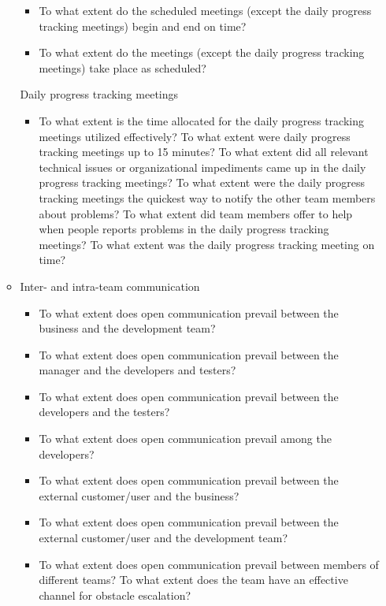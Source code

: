 \begin{appendices}
\begin{itemize}
\begin{itemize}
\begin{itemize}
					\item To what extent do the scheduled meetings (except the daily progress tracking meetings) begin and end on time? 
					\item To what extent do the meetings (except the daily progress tracking meetings) take place as scheduled? 
				\end{itemize}
			\addition Daily progress tracking meetings
				\begin{itemize}
					\item To what extent is the time allocated for the daily progress tracking meetings utilized effectively? 
					\addition To what extent were daily progress tracking meetings up to 15 minutes?
					\addition To what extent did all relevant technical issues or organizational impediments came up in the daily progress tracking meetings?
					\addition To what extent were the daily progress tracking meetings the quickest way to notify the other team members about problems?
					\addition To what extent did team members offer to help when people reports problems in the daily progress tracking meetings?
					\addition To what extent was the daily progress tracking meeting on time?
				\end{itemize}
			\item Inter- and intra-team communication
				\begin{itemize}
					\item To what extent does open communication prevail between the business and the development team? 
					\item To what extent does open communication prevail between the manager and the developers and testers? 
					\item To what extent does open communication prevail between the developers and the testers? 
					\item To what extent does open communication prevail among the developers? 
					\item To what extent does open communication prevail between the external customer/user and the business? 
					\item To what extent does open communication prevail between the external customer/user and the development team? 
					\item To what extent does open communication prevail between members of different teams?
					\addition To what extent does the team have an effective channel for obstacle escalation?
				\end{itemize}
		\end{itemize}

\end{itemize}
\end{appendices}
